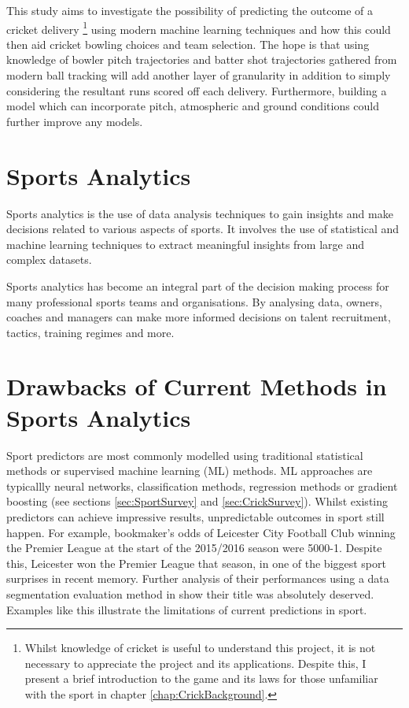 \documentclass[12pt,a4paper]{report}
\theoremstyle{definition}
\begin{document}
This study aims to investigate the possibility of predicting the outcome of a cricket delivery \footnote{Whilst knowledge of cricket is useful to understand this project, it is not necessary to appreciate the project and its applications. Despite this, I present a brief introduction to the game and its laws for those unfamiliar with the sport in chapter \ref{chap:CrickBackground}.} using modern machine learning techniques and how this could then aid cricket bowling choices and team selection. 
The hope is that using knowledge of bowler pitch trajectories and batter shot trajectories gathered from modern ball tracking will add another layer of granularity in addition to simply considering the resultant runs scored off each delivery. 
Furthermore, building a model which can incorporate pitch, atmospheric and ground conditions could further improve any models. 

\section{Sports Analytics}

Sports analytics is the use of data analysis techniques to gain insights and make decisions related to various aspects of sports.
It involves the use of statistical and machine learning techniques to extract meaningful insights from large and complex datasets.

Sports analytics has become an integral part of the decision making process for many professional sports teams and organisations. 
By analysing data, owners, coaches and managers can make more informed decisions on talent recruitment, tactics, training regimes and more.

\section{Drawbacks of Current Methods in Sports Analytics}
 
Sport predictors are most commonly modelled using traditional statistical methods or supervised machine learning (ML) methods.
ML approaches are typicallly neural networks, classification methods, regression methods or gradient boosting \citep{horvat2020} (see sections \ref{sec:SportSurvey} and \ref{sec:CrickSurvey}).
Whilst existing predictors can achieve impressive results, unpredictable outcomes in sport still happen. 
For example, bookmaker's odds of Leicester City Football Club winning the Premier League at the start of the 2015/2016 season were 5000-1.
Despite this, Leicester won the Premier League that season, in one of the biggest sport surprises in recent memory.
Further analysis of their performances using a data segmentation evaluation method in \citet{Ruiz2017} show their title was absolutely deserved.
Examples like this illustrate the limitations of current predictions in sport.
\end{document}

